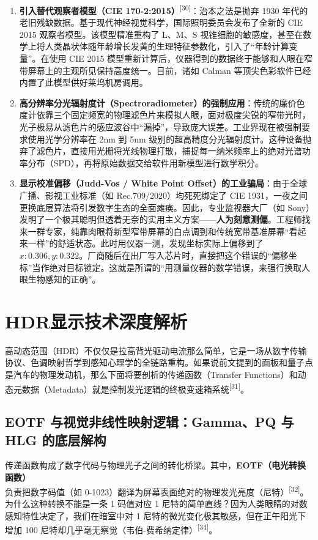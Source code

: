 \documentclass[12pt, a4paper]{ctexart}
\newcommand{\scite}[1]{\textsuperscript{[#1]}}
\begin{document}
\begin{enumerate}
    \item \textbf{引入替代观察者模型（CIE 170-2:2015）}\scite{30}：治本之法是抛弃 1930 年代的老旧残缺数据。基于现代神经视觉科学，国际照明委员会发布了全新的 CIE 2015 观察者模型。该模型精准重构了 L、M、S 视锥细胞的敏感度，甚至在数学上将人类晶状体随年龄增长发黄的生理特征参数化，引入了“年龄计算变量”。在使用 CIE 2015 模型重新计算后，仪器得到的数据终于能够和人眼在窄带屏幕上的主观所见保持高度统一。目前，诸如 Calman 等顶尖色彩软件已经内置了此模型供好莱坞机房调用。
    \item \textbf{高分辨率分光辐射度计（Spectroradiometer）的强制应用}：传统的廉价色度计依靠三个固定频宽的物理滤色片来模拟人眼，面对极度尖锐的窄带光时，光子极易从滤色片的感应波谷中“漏掉”，导致庞大误差。工业界现在被强制要求使用光学分辨率在 2nm 到 5nm 级别的超高精度分光辐射度计。这种设备抛弃了滤色片，直接用光栅将光线物理打散，捕捉每一纳米频率上的绝对光谱功率分布（SPD），再将原始数据交给软件用新模型进行数学积分。
    \item \textbf{显示校准偏移（Judd-Vos / White Point Offset）的工业骗局}：由于全球广播、影视工业标准（如 Rec.709/2020）均死死绑定了 CIE 1931，一夜之间更换底层算法将引发数字生态的全面瘫痪。因此，专业监视器大厂（如 Sony）发明了一个极其聪明但透着无奈的实用主义方案——\textbf{人为刻意测偏}。工程师找来一群专家，纯靠肉眼将新型窄带屏幕的白点调到和传统宽带基准屏幕“看起来一样”的舒适状态。此时用仪器一测，发现坐标实际上偏移到了 $x: 0.306, y: 0.322$。厂商随后在出厂写入芯片时，直接把这个错误的“偏移坐标”当作绝对目标锁定。这就是所谓的“用测量仪器的数学错误，来强行换取人眼生物感知的正确”。
\end{enumerate}

\newpage
\section{HDR显示技术深度解析}

高动态范围（HDR）不仅仅是拉高背光驱动电流那么简单，它是一场从数字传输协议、色调映射哲学到感知心理学的全链路重构。如果说前文提到的面板和量子点是汽车的物理发动机，那么下面将要剖析的传递函数（Transfer Functions）和动态元数据（Metadata）就是控制发光逻辑的终极变速箱系统\scite{31}。

\subsection{EOTF 与视觉非线性映射逻辑：Gamma、PQ 与 HLG 的底层解构}

传递函数构成了数字代码与物理光子之间的转化桥梁。其中，\textbf{EOTF（电光转换函数）} 负责把数字码值（如 0-1023）翻译为屏幕表面绝对的物理发光亮度（尼特）\scite{32}。为什么这种转换不能是一条 1 码值对应 1 尼特的简单直线？因为人类眼睛的对数感知特性决定了，我们在暗室中对 1 尼特的微光变化极其敏感，但在正午阳光下增加 100 尼特却几乎毫无察觉（韦伯-费希纳定律）\scite{34}。
\end{document}
